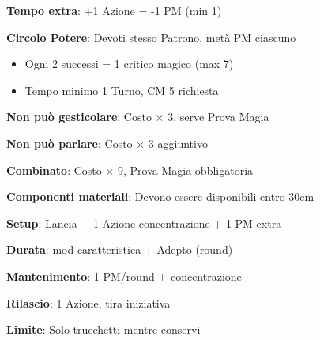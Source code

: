 \documentclass[10pt,a4paper,landscape]{article}
\begin{document}
\begin{multicols}{3}
\begin{tcolorbox}[title=ALTERAZIONI MAGIA]
			\textbf{Tempo extra}: +1 Azione = -1 PM (min 1)
			
			\textbf{Circolo Potere}: Devoti stesso Patrono, metà PM ciascuno
			\begin{itemize}[leftmargin=*,noitemsep]
				\item Ogni 2 successi = 1 critico magico (max 7)
				\item Tempo minimo 1 Turno, CM 5 richiesta
			\end{itemize}
		\end{tcolorbox}
		
		\begin{tcolorbox}[title=IMPEDIMENTI]
			\textbf{Non può gesticolare}: Costo $\times$ 3, serve Prova Magia
			
			\textbf{Non può parlare}: Costo $\times$ 3 aggiuntivo
			
			\textbf{Combinato}: Costo $\times$ 9, Prova Magia obbligatoria
			
			\textbf{Componenti materiali}: Devono essere disponibili entro 30cm
		\end{tcolorbox}
		
		\begin{tcolorbox}[title=CONSERVARE MAGIA]
			\textbf{Setup}: Lancia + 1 Azione concentrazione + 1 PM extra
			
			\textbf{Durata}: mod caratteristica + Adepto (round)
			
			\textbf{Mantenimento}: 1 PM/round + concentrazione
			
			\textbf{Rilascio}: 1 Azione, tira iniziativa
			
			\textbf{Limite}: Solo trucchetti mentre conservi
		\end{tcolorbox}
		
	\end{multicols}
	
\end{document}
